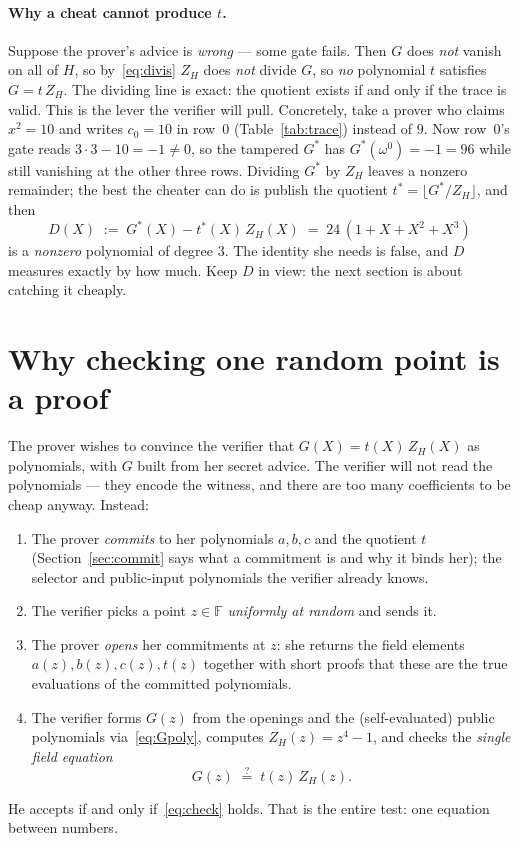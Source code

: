\documentclass[11pt,a4paper]{article}
\theoremstyle{definition}
\newcommand{\F}{\mathbb{F}}
\newcommand{\ZH}{Z_H}
\begin{document}
\paragraph{Why a cheat cannot produce $t$.} Suppose the prover's advice is
\emph{wrong} --- some gate fails. Then $G$ does \emph{not} vanish on all of
$H$, so by~\eqref{eq:divis} $\ZH$ does \emph{not} divide $G$, so \emph{no}
polynomial $t$ satisfies $G = t\,\ZH$. The dividing line is exact: the quotient
exists if and only if the trace is valid. This is the lever the verifier will
pull. Concretely, take a prover who claims $x^2 = 10$ and writes $c_0 = 10$ in
row~$0$ (Table~\ref{tab:trace}) instead of $9$. Now row~$0$'s gate reads
$3\cdot 3 - 10 = -1 \neq 0$, so the tampered $G^{\!*}$ has
$G^{\!*}(\omega^0) = -1 = 96$ while still vanishing at the other three rows.
Dividing $G^{\!*}$ by $\ZH$ leaves a nonzero remainder; the best the cheater
can do is publish the quotient $t^{\!*} = \lfloor G^{\!*}/\ZH\rfloor$, and then
\[
D(X) \;:=\; G^{\!*}(X) - t^{\!*}(X)\,\ZH(X) \;=\; 24\,(1 + X + X^2 + X^3)
\]
is a \emph{nonzero} polynomial of degree $3$. The identity she needs is false,
and $D$ measures exactly by how much. Keep $D$ in view: the next section is
about catching it cheaply.

\section{Why checking one random point is a proof}\label{sec:random}

The prover wishes to convince the verifier that $G(X) = t(X)\,\ZH(X)$ as
polynomials, with $G$ built from her secret advice. The verifier will not read
the polynomials --- they encode the witness, and there are too many
coefficients to be cheap anyway. Instead:

\begin{enumerate}[leftmargin=*,itemsep=1pt]
\item The prover \emph{commits} to her polynomials $a, b, c$ and the quotient
$t$ (Section~\ref{sec:commit} says what a commitment is and why it binds her);
the selector and public-input polynomials the verifier already knows.
\item The verifier picks a point $z \in \F$ \emph{uniformly at random} and
sends it.
\item The prover \emph{opens} her commitments at $z$: she returns the field
elements $a(z), b(z), c(z), t(z)$ together with short proofs that these are the
true evaluations of the committed polynomials.
\item The verifier forms $G(z)$ from the openings and the (self-evaluated)
public polynomials via~\eqref{eq:Gpoly}, computes $\ZH(z) = z^4 - 1$, and
checks the \emph{single field equation}
\begin{equation}\label{eq:check}
G(z) \;\overset{?}{=}\; t(z)\,\ZH(z).
\end{equation}
\end{enumerate}
He accepts if and only if~\eqref{eq:check} holds. That is the entire test: one
equation between numbers.
\end{document}
